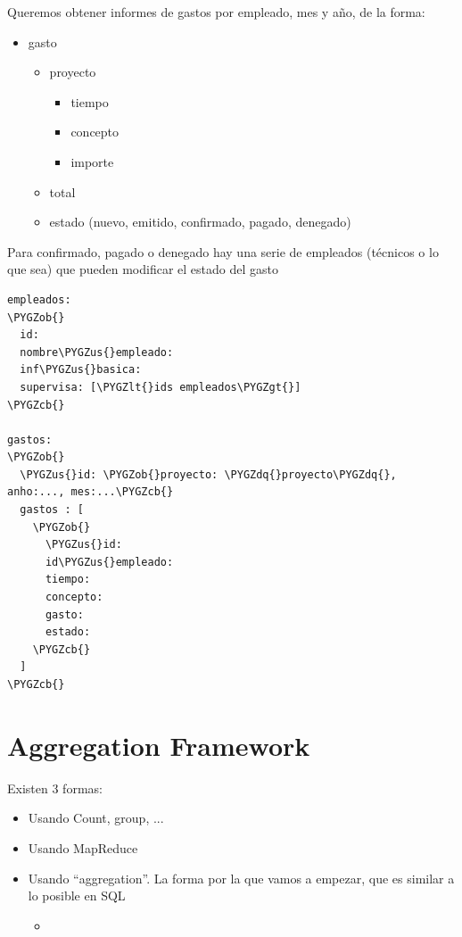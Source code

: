 \documentclass[a4paper,10pt,english]{sphinxmanual}
\def\PYGZus{\char`\_}
\def\PYGZob{\char`\{}
\def\PYGZcb{\char`\}}
\def\PYGZlt{\char`\<}
\def\PYGZgt{\char`\>}
\def\PYGZdq{\char`\"}
\begin{document}
Queremos obtener informes de gastos por empleado, mes y año, de la forma:
\begin{itemize}
\item {} 
gasto
\begin{itemize}
\item {} 
proyecto
\begin{itemize}
\item {} 
tiempo

\item {} 
concepto

\item {} 
importe

\end{itemize}

\item {} 
total

\item {} 
estado (nuevo, emitido, confirmado, pagado, denegado)

\end{itemize}

\end{itemize}

Para confirmado, pagado o denegado hay una serie de empleados (técnicos o lo que sea) que pueden modificar el estado del gasto

\begin{Verbatim}[commandchars=\\\{\}]
empleados:
\PYGZob{}
  id:
  nombre\PYGZus{}empleado:
  inf\PYGZus{}basica:
  supervisa: [\PYGZlt{}ids empleados\PYGZgt{}]
\PYGZcb{}

gastos:
\PYGZob{}
  \PYGZus{}id: \PYGZob{}proyecto: \PYGZdq{}proyecto\PYGZdq{}, anho:..., mes:...\PYGZcb{}
  gastos : [
    \PYGZob{}
      \PYGZus{}id:
      id\PYGZus{}empleado:
      tiempo:
      concepto:
      gasto:
      estado:
    \PYGZcb{}
  ]
\PYGZcb{}
\end{Verbatim}


\chapter{Aggregation Framework}
\label{contents/aggregationFramework:aggregation-framework}\label{contents/aggregationFramework::doc}
Existen 3 formas:
\begin{itemize}
\item {} 
Usando Count, group, ...

\item {} 
Usando MapReduce

\item {} 
Usando ``aggregation''. La forma por la que vamos a empezar, que es similar a lo posible en SQL
\begin{itemize}
\item {} 

\end{itemize}

\end{itemize}
\end{document}
